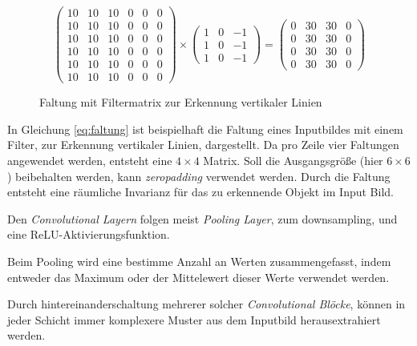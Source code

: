 \begin{equation}
    \label{eq:faltung}
    \begin{pmatrix}
        10 & 10 & 10 & 0 & 0 & 0\\
        10 & 10 & 10 & 0 & 0 & 0\\
        10 & 10 & 10 & 0 & 0 & 0\\
        10 & 10 & 10 & 0 & 0 & 0\\
        10 & 10 & 10 & 0 & 0 & 0\\
        10 & 10 & 10 & 0 & 0 & 0
    \end{pmatrix}
    \times
    \begin{pmatrix}
        1 & 0 & -1\\
        1 & 0 & -1\\
        1 & 0 & -1
    \end{pmatrix}
    = 
    \begin{pmatrix}
        0 & 30 & 30 & 0\\
        0 & 30 & 30 & 0\\
        0 & 30 & 30 & 0\\
        0 & 30 & 30 & 0
    \end{pmatrix}
\end{equation}
\vspace{0.5cm}
\begin{figure}[H]
    \centering
    \def\svgwidth{0.6\textwidth}
    
    \caption{Faltung mit Filtermatrix zur Erkennung vertikaler Linien}
    \label{fig:faltung3}
\end{figure}

In Gleichung \ref{eq:faltung} ist beispielhaft die Faltung 
eines Inputbildes mit einem Filter, zur Erkennung 
vertikaler Linien, dargestellt. Da pro Zeile 
vier Faltungen angewendet werden, entsteht 
eine $4\times4$ Matrix. Soll die Ausgangsgröße 
(hier $6\times6$) beibehalten werden, kann
\textit{\Gls{zeropadding}} verwendet werden.
Durch die Faltung entsteht eine räumliche 
Invarianz für das zu erkennende Objekt im 
Input Bild.

Den \textit{Convolutional Layern} folgen meist
\textit{Pooling Layer}, zum \Gls{downsampling},
und eine ReLU-Aktivierungsfunktion.

Beim Pooling wird eine bestimme Anzahl an Werten 
zusammengefasst, indem entweder das Maximum oder der 
Mittelewert dieser Werte verwendet werden.

Durch hintereinanderschaltung mehrerer solcher
\textit{Convolutional Blöcke},
können in jeder Schicht immer komplexere Muster aus dem 
Inputbild herausextrahiert werden.

